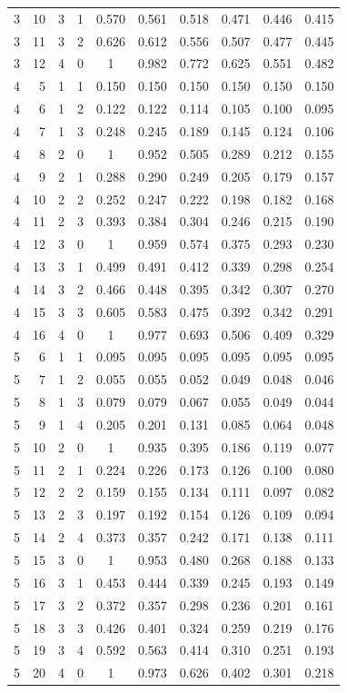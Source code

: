 \begin{table}[p]
\begin{tabular}{rrrr cccccc}
3 & 10 & 3 & 1 & 0.570 & 0.561 & 0.518 & 0.471 & 0.446 & 0.415 \\
3 & 11 & 3 & 2 & 0.626 & 0.612 & 0.556 & 0.507 & 0.477 & 0.445 \\
3 & 12 & 4 & 0 & 1 & 0.982 & 0.772 & 0.625 & 0.551 & 0.482 \\
\midrule
4 & 5 & 1 & 1 & 0.150 & 0.150 & 0.150 & 0.150 & 0.150 & 0.150 \\
4 & 6 & 1 & 2 & 0.122 & 0.122 & 0.114 & 0.105 & 0.100 & 0.095 \\
4 & 7 & 1 & 3 & 0.248 & 0.245 & 0.189 & 0.145 & 0.124 & 0.106 \\
4 & 8 & 2 & 0 & 1 & 0.952 & 0.505 & 0.289 & 0.212 & 0.155 \\
4 & 9 & 2 & 1 & 0.288 & 0.290 & 0.249 & 0.205 & 0.179 & 0.157 \\
4 & 10 & 2 & 2 & 0.252 & 0.247 & 0.222 & 0.198 & 0.182 & 0.168 \\
4 & 11 & 2 & 3 & 0.393 & 0.384 & 0.304 & 0.246 & 0.215 & 0.190 \\
4 & 12 & 3 & 0 & 1 & 0.959 & 0.574 & 0.375 & 0.293 & 0.230 \\
4 & 13 & 3 & 1 & 0.499 & 0.491 & 0.412 & 0.339 & 0.298 & 0.254 \\
4 & 14 & 3 & 2 & 0.466 & 0.448 & 0.395 & 0.342 & 0.307 & 0.270 \\
4 & 15 & 3 & 3 & 0.605 & 0.583 & 0.475 & 0.392 & 0.342 & 0.291 \\
4 & 16 & 4 & 0 & 1 & 0.977 & 0.693 & 0.506 & 0.409 & 0.329 \\
\midrule
5 & 6 & 1 & 1 & 0.095 & 0.095 & 0.095 & 0.095 & 0.095 & 0.095 \\
5 & 7 & 1 & 2 & 0.055 & 0.055 & 0.052 & 0.049 & 0.048 & 0.046 \\
5 & 8 & 1 & 3 & 0.079 & 0.079 & 0.067 & 0.055 & 0.049 & 0.044 \\
5 & 9 & 1 & 4 & 0.205 & 0.201 & 0.131 & 0.085 & 0.064 & 0.048 \\
5 & 10 & 2 & 0 & 1 & 0.935 & 0.395 & 0.186 & 0.119 & 0.077 \\
5 & 11 & 2 & 1 & 0.224 & 0.226 & 0.173 & 0.126 & 0.100 & 0.080 \\
5 & 12 & 2 & 2 & 0.159 & 0.155 & 0.134 & 0.111 & 0.097 & 0.082 \\
5 & 13 & 2 & 3 & 0.197 & 0.192 & 0.154 & 0.126 & 0.109 & 0.094 \\
5 & 14 & 2 & 4 & 0.373 & 0.357 & 0.242 & 0.171 & 0.138 & 0.111 \\
5 & 15 & 3 & 0 & 1 & 0.953 & 0.480 & 0.268 & 0.188 & 0.133 \\
5 & 16 & 3 & 1 & 0.453 & 0.444 & 0.339 & 0.245 & 0.193 & 0.149 \\
5 & 17 & 3 & 2 & 0.372 & 0.357 & 0.298 & 0.236 & 0.201 & 0.161 \\
5 & 18 & 3 & 3 & 0.426 & 0.401 & 0.324 & 0.259 & 0.219 & 0.176 \\
5 & 19 & 3 & 4 & 0.592 & 0.563 & 0.414 & 0.310 & 0.251 & 0.193 \\
5 & 20 & 4 & 0 & 1 & 0.973 & 0.626 & 0.402 & 0.301 & 0.218 \\
    \bottomrule
  \end{tabular}
\end{table}

